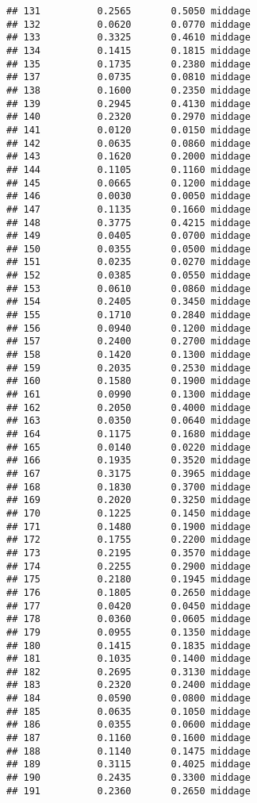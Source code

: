 \documentclass[
]{article}
\begin{document}
\begin{verbatim}
## 131          0.2565       0.5050 middage
## 132          0.0620       0.0770 middage
## 133          0.3325       0.4610 middage
## 134          0.1415       0.1815 middage
## 135          0.1735       0.2380 middage
## 137          0.0735       0.0810 middage
## 138          0.1600       0.2350 middage
## 139          0.2945       0.4130 middage
## 140          0.2320       0.2970 middage
## 141          0.0120       0.0150 middage
## 142          0.0635       0.0860 middage
## 143          0.1620       0.2000 middage
## 144          0.1105       0.1160 middage
## 145          0.0665       0.1200 middage
## 146          0.0030       0.0050 middage
## 147          0.1135       0.1660 middage
## 148          0.3775       0.4215 middage
## 149          0.0405       0.0700 middage
## 150          0.0355       0.0500 middage
## 151          0.0235       0.0270 middage
## 152          0.0385       0.0550 middage
## 153          0.0610       0.0860 middage
## 154          0.2405       0.3450 middage
## 155          0.1710       0.2840 middage
## 156          0.0940       0.1200 middage
## 157          0.2400       0.2700 middage
## 158          0.1420       0.1300 middage
## 159          0.2035       0.2530 middage
## 160          0.1580       0.1900 middage
## 161          0.0990       0.1300 middage
## 162          0.2050       0.4000 middage
## 163          0.0350       0.0640 middage
## 164          0.1175       0.1680 middage
## 165          0.0140       0.0220 middage
## 166          0.1935       0.3520 middage
## 167          0.3175       0.3965 middage
## 168          0.1830       0.3700 middage
## 169          0.2020       0.3250 middage
## 170          0.1225       0.1450 middage
## 171          0.1480       0.1900 middage
## 172          0.1755       0.2200 middage
## 173          0.2195       0.3570 middage
## 174          0.2255       0.2900 middage
## 175          0.2180       0.1945 middage
## 176          0.1805       0.2650 middage
## 177          0.0420       0.0450 middage
## 178          0.0360       0.0605 middage
## 179          0.0955       0.1350 middage
## 180          0.1415       0.1835 middage
## 181          0.1035       0.1400 middage
## 182          0.2695       0.3130 middage
## 183          0.2320       0.2400 middage
## 184          0.0590       0.0800 middage
## 185          0.0635       0.1050 middage
## 186          0.0355       0.0600 middage
## 187          0.1160       0.1600 middage
## 188          0.1140       0.1475 middage
## 189          0.3115       0.4025 middage
## 190          0.2435       0.3300 middage
## 191          0.2360       0.2650 middage

\end{verbatim}
\end{document}
